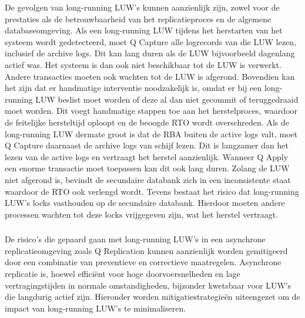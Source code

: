 De gevolgen van long-running LUW's kunnen aanzienlijk zijn, zowel voor de prestaties als de betrouwbaarheid van het replicatieproces en de algemene databaseomgeving.
Als een long-running LUW tijdens het herstarten van het systeem wordt gedetecteerd, moet Q Capture alle logrecords van die LUW lezen, inclusief de archive logs.
Dit kan lang duren als de LUW bijvoorbeeld dagenlang actief was.
Het systeem is dan ook niet beschikbaar tot de LUW is verwerkt.
Andere transacties moeten ook wachten tot de LUW is afgerond.
Bovendien kan het zijn dat er handmatige interventie noodzakelijk is, omdat er bij een long-running LUW beslist moet worden of deze al dan niet gecommit of teruggedraaid moet worden.
Dit voegt handmatige stappen toe aan het herstelproces, waardoor de feitelijke hersteltijd oploopt en de beoogde RTO wordt overschreden.
Als de long-running LUW dermate groot is dat de RBA buiten de active logs valt, moet Q Capture daarnaast de archive logs van schijf lezen.
Dit is langzamer dan het lezen van de active logs en vertraagt het herstel aanzienlijk.
Wanneer Q Apply een enorme transactie moet toepassen kan dit ook lang duren.
Zolang de LUW niet afgerond is, bevindt de secundaire databank zich in een inconsistente staat waardoor de RTO ook verlengd wordt.
Tevens bestaat het risico dat long-running LUW's locks vasthouden op de secundaire databank.
Hierdoor moeten andere processen wachten tot deze locks vrijgegeven zijn, wat het herstel vertraagt.

\subsubsection{}
\label{sec:asynchrone-log-replicatie-mitigatie-long-running-logical-units-of-work}

De risico's die gepaard gaan met long-running LUW's in een asynchrone replicatieomgeving zoals Q Replication kunnen aanzienlijk worden gemitigeerd door een combinatie van preventieve en correctieve maatregelen. 
Asynchrone replicatie is, hoewel efficiënt voor hoge doorvoersnelheden en lage vertragingstijden in normale omstandigheden, bijzonder kwetsbaar voor LUW's die langdurig actief zijn.
Hieronder worden mitigatiestrategieën uiteengezet om de impact van long-running LUW's te minimaliseren.

